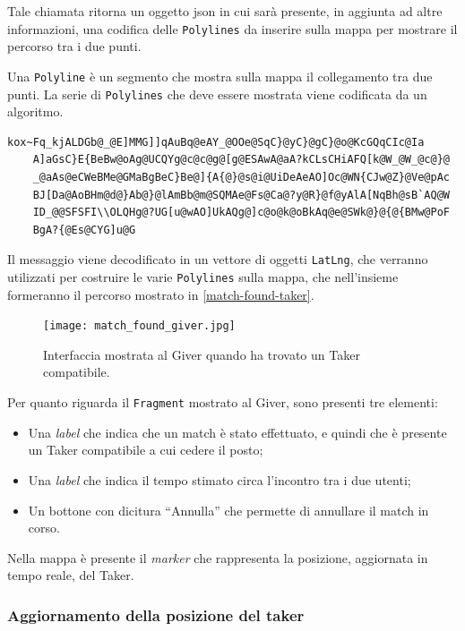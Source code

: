 Tale chiamata ritorna un oggetto json in cui sarà presente, in aggiunta ad altre informazioni, una codifica delle \texttt{Polylines} da inserire sulla mappa per mostrare il percorso tra i due punti.

Una \texttt{Polyline} è un segmento che mostra sulla mappa il collegamento tra due punti. La serie di \texttt{Polylines} che deve essere mostrata viene codificata da un algoritmo.
\begin{lstlisting}[caption=Lista di \texttt{Polylines} codificata]
    kox~Fq_kjALDGb@_@E]MMG]]qAuBq@eAY_@OOe@SqC}@yC}@gC}@o@KcGQqCIc@Ia
    A]aGsC}E{BeBw@oAg@UCQYg@c@c@g@[g@ESAwA@aA?kCLsCHiAFQ[k@W_@W_@c@}@
    _@aAs@eCWeBMe@GMaBgBeC}Be@]{A{@}@s@i@UiDeAeAO]Oc@WN{CJw@Z}@Ve@pAc
    BJ[Da@AoBHm@d@}Ab@}@lAmBb@m@SQMAe@Fs@Ca@?y@R}@f@yAlA[NqBh@sB`AQ@W
    ID_@@SFSFI\\OLQHg@?UG[u@wAO]UkAQg@]c@o@k@oBkAq@e@SWk@}@{@{BMw@PoF
    BgA?{@Es@CYG]u@G
\end{lstlisting}
 Il messaggio viene decodificato in un vettore di oggetti \texttt{LatLng}, che verranno utilizzati per costruire le varie \texttt{Polylines} sulla mappa, che nell'insieme formeranno il percorso mostrato in \autoref{match-found-taker}. 

\begin{figure}[H]
\centering
\texttt{[image: match\_found\_giver.jpg]}
\caption{Interfaccia mostrata al Giver quando ha trovato un
Taker compatibile.}
\end{figure}


Per quanto riguarda il \texttt{Fragment} mostrato al Giver, sono presenti tre elementi:

\begin{itemize}
    \item Una \emph{label} che indica che un match è stato effettuato, e quindi che è presente un Taker compatibile a cui cedere il posto;
    \item Una \emph{label} che indica il tempo stimato circa l'incontro tra i due utenti;
    \item Un bottone con dicitura ``Annulla'' che permette di annullare il match in corso.
\end{itemize}
Nella mappa è presente il \textit{marker} che rappresenta la posizione, aggiornata in tempo reale, del Taker.

\hypertarget{aggiornamento-della-posizione-del-taker}{%
\subsubsection{Aggiornamento della posizione del taker}\label{aggiornamento-della-posizione-del-taker}}

